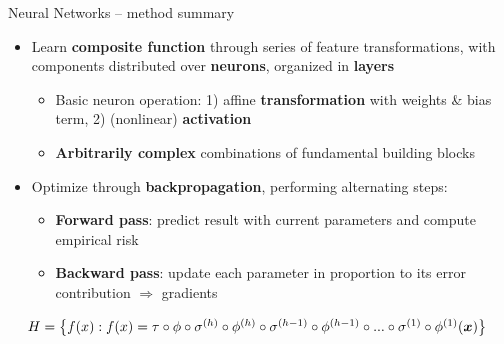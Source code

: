 \setdraft

\begin{frame}{Neural Networks -- method summary}

 
 

\medskip

\begin{itemize}
  \item Learn \textbf{composite function} through series of feature 
  transformations, with components distributed over \textbf{neurons}, organized 
  in \textbf{layers}
  \begin{itemize}
    \item Basic neuron operation: 1) affine \textbf{transformation} with 
    weights \& bias term, 
    2) (nonlinear) \textbf{activation}
    \item \textbf{Arbitrarily complex} combinations of fundamental building 
    blocks
  \end{itemize}
  \item Optimize through \textbf{backpropagation}, performing alternating steps:
  \begin{itemize}
    \item \textbf{Forward pass}: predict result with current parameters and 
    compute empirical risk 
    \item \textbf{Backward pass}: update each parameter in proportion to its 
    error contribution $\Rightarrow$ gradients
  \end{itemize}
\end{itemize}

\medskip
 
 ~~
$H = \left\{ f(x): f(x) = \tau \circ \phi \circ \sigma^{(h)} \circ
\phi^{(h)} \circ \sigma^{(h - 1)} \circ \phi^{(h - 1)} \circ ... \circ 
\sigma^{(1)} \circ \phi^{(1)} (\bm{x}) \right\}$

\smallskip


\end{frame}
